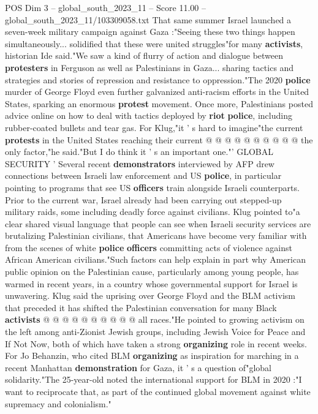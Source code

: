 \begin{textsample}{POS Dim 3 – global\_south\_2023\_11 – Score 11.00 – global\_south\_2023\_11/103309058.txt}
That same summer Israel launched a seven-week military campaign against Gaza :"Seeing these two things happen simultaneously... solidified that these were united struggles"for many \textbf{activists}, historian Ide said."We saw a kind of flurry of action and dialogue between \textbf{protesters} in Ferguson as well as Palestinians in Gaza... sharing tactics and strategies and stories of repression and resistance to oppression."The 2020 \textbf{police} murder of George Floyd even further galvanized anti-racism efforts in the United States, sparking an enormous \textbf{protest} movement.
Once more, Palestinians posted advice online on how to deal with tactics deployed by \textbf{riot} \textbf{police}, including rubber-coated bullets and tear gas.
For Klug,"it ' s hard to imagine"the current \textbf{protests} in the United States reaching their current @ @ @ @ @ @ @ @ @ @ the only factor,"he said."But I do think it ' s an important one."' GLOBAL SECURITY ' Several recent \textbf{demonstrators} interviewed by AFP drew connections between Israeli law enforcement and US \textbf{police}, in particular pointing to programs that see US \textbf{officers} train alongside Israeli counterparts.
Prior to the current war, Israel already had been carrying out stepped-up military raids, some including deadly force against civilians.
Klug pointed to"a clear shared visual language that people can see when Israeli security services are brutalizing Palestinian civilians, that Americans have become very familiar with from the scenes of white \textbf{police} \textbf{officers} committing acts of violence against African American civilians."Such factors can help explain in part why American public opinion on the Palestinian cause, particularly among young people, has warmed in recent years, in a country whose governmental support for Israel is unwavering.
Klug said the uprising over George Floyd and the BLM activism that preceded it has shifted the Palestinian conversation for many Black \textbf{activists} @ @ @ @ @ @ @ @ @ @ all races."He pointed to growing activism on the left among anti-Zionist Jewish groups, including Jewish Voice for Peace and If Not Now, both of which have taken a strong \textbf{organizing} role in recent weeks.
For Jo Behanzin, who cited BLM \textbf{organizing} as inspiration for marching in a recent Manhattan \textbf{demonstration} for Gaza, it ' s a question of"global solidarity."The 25-year-old noted the international support for BLM in 2020 :"I want to reciprocate that, as part of the continued global movement against white supremacy and colonialism."

\end{textsample}
